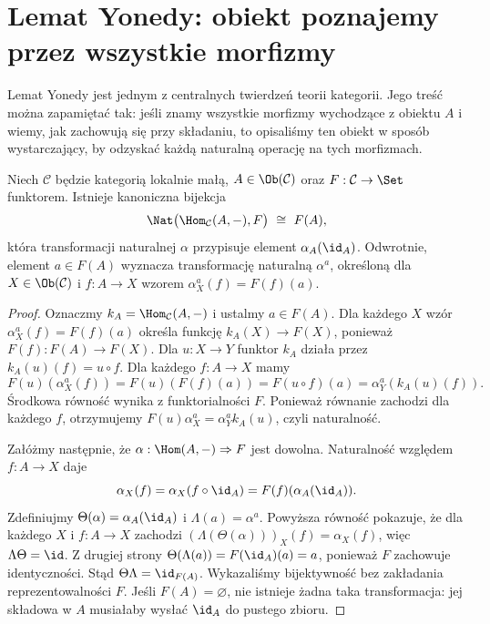 \providecommand{\atlasref}[2]{#2}
\section{Lemat Yonedy: obiekt poznajemy przez wszystkie morfizmy}\label{sec:yoneda}

Lemat Yonedy jest jednym z centralnych twierdzeń teorii kategorii. Jego treść można zapamiętać tak: jeśli znamy wszystkie morfizmy wychodzące z obiektu $A$ i wiemy, jak zachowują się przy składaniu, to opisaliśmy ten obiekt w sposób wystarczający, by odzyskać każdą naturalną operację na tych morfizmach.

\begin{twierdzenie}\label{tw:yoneda}
Niech $\mathcal C$ będzie kategorią lokalnie małą, $A\in\Ob(\mathcal C)$ oraz $F:\mathcal C\to\Set$ funktorem. Istnieje kanoniczna bijekcja
\[
\Nat\bigl(\Hom_{\mathcal C}(A,-),F\bigr)\ \cong\ F(A),
\]
która transformacji naturalnej $\alpha$ przypisuje element $\alpha_A(\id_A)$. Odwrotnie, element $a\in F(A)$ wyznacza transformację naturalną $\alpha^a$, określoną dla $X\in\Ob(\mathcal C)$ i $f:A\to X$ wzorem $\alpha^a_X(f)=F(f)(a)$.
\end{twierdzenie}
\begin{proof}
Oznaczmy $k_A=\Hom_{\mathcal C}(A,-)$ i ustalmy $a\in F(A)$. Dla każdego $X$ wzór $\alpha^a_X(f)=F(f)(a)$ określa funkcję $k_A(X)\to F(X)$, ponieważ $F(f):F(A)\to F(X)$. Dla $u:X\to Y$ funktor $k_A$ działa przez $k_A(u)(f)=u\circ f$. Dla każdego $f:A\to X$ mamy
\[
F(u)(\alpha^a_X(f))=F(u)(F(f)(a))
=F(u\circ f)(a)=\alpha^a_Y(k_A(u)(f)).
\]
Środkowa równość wynika z funktorialności $F$. Ponieważ równanie zachodzi dla każdego $f$, otrzymujemy $F(u)\alpha^a_X=\alpha^a_Y k_A(u)$, czyli naturalność.

Załóżmy następnie, że $\alpha:\Hom(A,-)\Rightarrow F$ jest dowolna. Naturalność względem $f:A\to X$ daje
\[
\alpha_X(f)=\alpha_X(f\circ\id_A)=F(f)(\alpha_A(\id_A)).
\]
Zdefiniujmy $\Theta(\alpha)=\alpha_A(\id_A)$ i $\Lambda(a)=\alpha^a$. Powyższa równość pokazuje, że dla każdego $X$ i $f:A\to X$ zachodzi
$(\Lambda(\Theta(\alpha)))_X(f)=\alpha_X(f)$, więc $\Lambda\Theta=\id$. Z drugiej strony $\Theta(\Lambda(a))=F(\id_A)(a)=a$, ponieważ $F$ zachowuje identyczności. Stąd $\Theta\Lambda=\id_{F(A)}$. Wykazaliśmy bijektywność bez zakładania reprezentowalności $F$. Jeśli $F(A)=\varnothing$, nie istnieje żadna taka transformacja: jej składowa w $A$ musiałaby wysłać $\id_A$ do pustego zbioru.
\end{proof}

